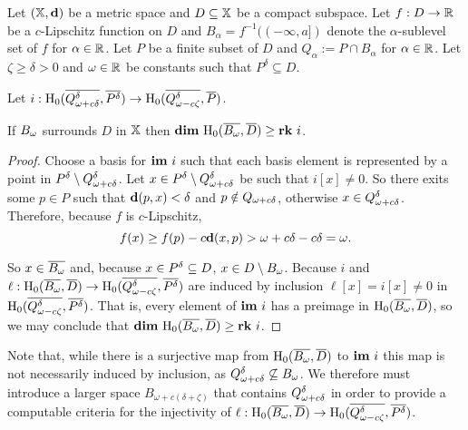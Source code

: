 

Let $(\mathbb{X},\mathbf{d})$ be a metric space and $D\subseteq \mathbb{X}$ be a compact subspace.
Let $f : D\to \mathbb{R}$ be a $c$-Lipschitz function on $D$ and $B_\alpha = f^{-1}((-\infty, a])$ denote the $\alpha$-sublevel set of $f$ for $\alpha\in\mathbb{R}$.
Let $P$ be a finite subset of $D$ and $Q_\alpha := P\cap B_\alpha$ for $\alpha\in\mathbb{R}$.
Let $\zeta\geq\delta > 0 $ and $\omega\in \mathbb{R}$ be constants such that $P^\delta\subseteq D$.

\begin{lemma}\label{lem:psurj}
  Let $i : \mathrm{H}_0(\overline{Q_{\omega + c{\delta}}^{\delta}}, \overline{P^{\delta}})\to \mathrm{H}_0(\overline{Q_{\omega - c\zeta}^{\delta}}, \overline{P})$.

  If $B_{\omega}$ surrounds $D$ in $\mathbb{X}$ then $\mathbf{dim}~\mathrm{H}_0(\overline{B_{\omega}}, \overline{D})\geq \mathbf{rk}~i$.
\end{lemma}
\begin{proof}
  Choose a basis for $\mathbf{im}~i$ such that each basis element is represented by a point in $P^{\delta}\setminus Q_{\omega + c{\delta}}^{\delta}$.
  Let $x\in P^{\delta}\setminus Q_{\omega + c{\delta}}^{\delta}$ be such that $i[x] \neq 0$.
  So there exits some $p\in P$ such that $\mathbf{d}(p, x) < \delta$ and $p\notin Q_{\omega + c{\delta}}$, otherwise $x\in Q_{\omega + c{\delta}}^{\delta}$.
  Therefore, because $f$ is $c$-Lipschitz,
  \[ f(x)\geq f(p) - c\mathbf{d}(x, p) > \omega + c{\delta} - c{\delta} =\omega.\]

  So $x\in\overline{B_{\omega}}$ and, because $x\in P^{\delta}\subseteq D$, $x\in D\setminus B_{\omega}$.
  Because $i$ and $\ell : \mathrm{H}_0(\overline{B_{\omega}}, \overline{D})\to \mathrm{H}_0(\overline{Q_{\omega - c\zeta}^{\delta}}, \overline{P^{\delta}})$ are induced by inclusion $\ell[x] = i[x]\neq 0$ in $\mathrm{H}_0(\overline{Q_{\omega - c\zeta}^{\delta}}, \overline{P^{\delta}})$.
  That is, every element of $\mathbf{im}~i$ has a preimage in $\mathrm{H}_0(\overline{B_{\omega}}, \overline{D})$, so we may conclude that $\mathbf{dim}~\mathrm{H}_0(\overline{B_{\omega}}, \overline{D})\geq \mathbf{rk}~i$.
\end{proof}

Note that, while there is a surjective map from $\mathrm{H}_0(\overline{B_{\omega}}, \overline{D})$ to $\mathbf{im}~i$ this map is not necessarily induced by inclusion, as $Q_{\omega + c{\delta}}^{\delta}\not\subseteq B_{\omega}$.
We therefore must introduce a larger space $B_{\omega+c(\delta+\zeta)}$ that contains $Q_{\omega + c{\delta}}^{\delta}$ in order to provide a computable criteria for the injectivity of $\ell : \mathrm{H}_0(\overline{B_{\omega}}, \overline{D})\to\mathrm{H}_0(\overline{Q_{\omega - c\zeta}^{\delta}}, \overline{P^{\delta}})$.

